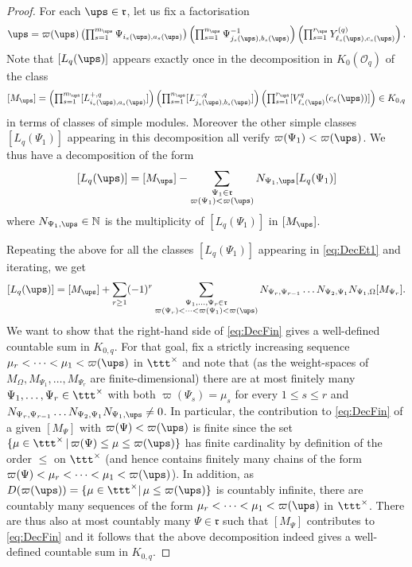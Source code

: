 \documentclass[11pt]{amsart}
\theoremstyle{definition}
\theoremstyle{remark}
\numberwithin{equation}{section}
\begin{document}
\begin{proof} For each $\ups\in\mathfrak{r}$, let us fix a factorisation 
$$\textstyle \ups=\varpi(\ups)\left(\prod_{s=1}^{m_{\ups}} \Psi_{i_s(\ups),a_s(\ups)}\right)\left(\prod_{s=1}^{n_{\ups}} \Psi_{j_s(\ups),b_s(\ups)}^{-1}\right)\left(\prod_{s=1}^{r_{\ups}} Y_{\ell_s(\ups),c_s(\ups)}^{(q)}\right).$$
Note that $[L_q(\ups)]$ appears exactly once in the decomposition in $K_0(\mathcal{O}_q)$ of the class
$$\textstyle [M_{\ups}] = \left(\prod_{s=1}^{m_{\ups}} [L_{i_s(\ups),a_s(\ups)}^{+,q}]\right)\left(\prod_{s=1}^{n_{\ups}} [L_{j_s(\ups),b_s(\ups)}^{-,q}]\right)\left(\prod_{s=1}^{r_{\ups}} [V^{q}_{\ell_s(\ups)}(c_s(\ups))]\right)\in K_{0,q}$$
in terms of classes of simple modules. Moreover the other simple classes $[L_q(\Psi_1)]$ appearing in this decomposition all verify $\varpi(\Psi_1)< \varpi(\ups)$. We thus have a decomposition of the form
\begin{equation}\label{eq:DecEt1}
[L_q(\ups)] = [M_{\ups}]- \sum_{\substack{\Psi_1\in\mathfrak{r} \\ \varpi(\Psi_1) < \varpi(\ups)}} N_{\Psi_1,\ups}[L_q(\Psi_1)]
\end{equation}
where $N_{\Psi_1,\ups} \in \mathbb{N}$ is the multiplicity of $[L_q(\Psi_1)]$ in $[M_{\ups}]$.\par
Repeating the above for all the classes $[L_q(\Psi_1)]$ appearing in \eqref{eq:DecEt1} and iterating, we get 
\begin{equation}\label{eq:DecFin}
[L_q(\ups)] = [M_{\ups}]+\sum_{r\geq 1}(-1)^r\sum_{\substack{\Psi_1,...,\Psi_r\in\mathfrak{r}\\\varpi(\Psi_r)<\dots<\varpi(\Psi_1)<\varpi(\ups)}}N_{\Psi_r,\Psi_{r-1}}\dots N_{\Psi_2,\Psi_1}N_{\Psi_1,\Omega}[M_{\Psi_r}].
\end{equation} 
We want to show that the right-hand side of \eqref{eq:DecFin} gives a well-defined countable sum in $K_{0,q}$. For that goal, fix a strictly increasing sequence $\mu_r<\dots<\mu_1<\varpi(\ups)$ in $\ttt^{\times}$ and note that (as the weight-spaces of $M_{\Omega}, M_{\Psi_1}, \dots ,M_{\Psi_r}$ are finite-dimensional) there are at most finitely many $\Psi_1,\dots,\Psi_r\in \ttt^{\times}$ with both $\varpi(\Psi_s) = \mu_s$ for every $1\leq s\leq r$ and $N_{\Psi_r,\Psi_{r-1}}\dots N_{\Psi_2,\Psi_1}N_{\Psi_1,\ups}\neq 0$. In particular, the contribution to \eqref{eq:DecFin} of a given $[M_{\Psi}]$ with $\varpi(\Psi) < \varpi(\ups)$ is finite since the set $\{\mu\in\ttt^{\times}\,|\,\varpi(\Psi)\leq\mu\leq\varpi(\ups)\}$ has finite cardinality by definition of the order $\leq$ on $\ttt^{\times}$ (and hence contains finitely many chains of the form $\varpi(\Psi)<\mu_r<\dots<\mu_1<\varpi(\ups)$). In addition, as $D(\varpi(\ups)) = \{\mu\in\ttt^{\times}|\,\mu\leq \varpi(\ups)\}$ is countably infinite, there are countably many sequences of the form $\mu_r<\dots<\mu_1<\varpi(\ups)$ in $\ttt^{\times}$. There are thus also at most countably many $\Psi\in \mathfrak{r}$ such that $[M_{\Psi}]$ contributes to \eqref{eq:DecFin} and it follows that the above decomposition indeed gives a well-defined countable sum in $K_{0,q}$.\par 

\end{proof}
\end{document}
